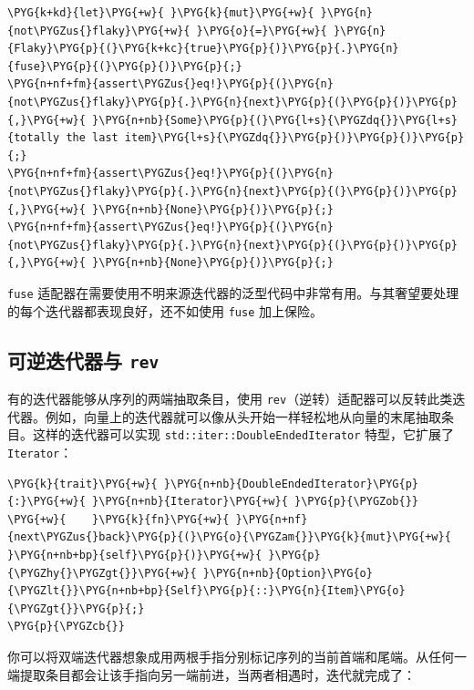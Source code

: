 \begin{Verbatim}[commandchars=\\\{\},breaklines=true,breakanywhere=true,fontsize=\codefont,xleftmargin=17bp]
\PYG{k+kd}{let}\PYG{+w}{ }\PYG{k}{mut}\PYG{+w}{ }\PYG{n}{not\PYGZus{}flaky}\PYG{+w}{ }\PYG{o}{=}\PYG{+w}{ }\PYG{n}{Flaky}\PYG{p}{(}\PYG{k+kc}{true}\PYG{p}{)}\PYG{p}{.}\PYG{n}{fuse}\PYG{p}{(}\PYG{p}{)}\PYG{p}{;}
\PYG{n+nf+fm}{assert\PYGZus{}eq!}\PYG{p}{(}\PYG{n}{not\PYGZus{}flaky}\PYG{p}{.}\PYG{n}{next}\PYG{p}{(}\PYG{p}{)}\PYG{p}{,}\PYG{+w}{ }\PYG{n+nb}{Some}\PYG{p}{(}\PYG{l+s}{\PYGZdq{}}\PYG{l+s}{totally the last item}\PYG{l+s}{\PYGZdq{}}\PYG{p}{)}\PYG{p}{)}\PYG{p}{;}
\PYG{n+nf+fm}{assert\PYGZus{}eq!}\PYG{p}{(}\PYG{n}{not\PYGZus{}flaky}\PYG{p}{.}\PYG{n}{next}\PYG{p}{(}\PYG{p}{)}\PYG{p}{,}\PYG{+w}{ }\PYG{n+nb}{None}\PYG{p}{)}\PYG{p}{;}
\PYG{n+nf+fm}{assert\PYGZus{}eq!}\PYG{p}{(}\PYG{n}{not\PYGZus{}flaky}\PYG{p}{.}\PYG{n}{next}\PYG{p}{(}\PYG{p}{)}\PYG{p}{,}\PYG{+w}{ }\PYG{n+nb}{None}\PYG{p}{)}\PYG{p}{;}
\end{Verbatim}

\texttt{fuse} 适配器在需要使用不明来源迭代器的泛型代码中非常有用。与其奢望要处理的每个迭代器都表现良好，还不如使用 \texttt{fuse} 加上保险。

\subsection{可逆迭代器与 \texttt{rev}}

有的迭代器能够从序列的两端抽取条目，使用 \texttt{rev}（逆转）适配器可以反转此类迭代器。例如，向量上的迭代器就可以像从头开始一样轻松地从向量的末尾抽取条目。这样的迭代器可以实现 \texttt{std::iter::DoubleEndedIterator} 特型，它扩展了 \texttt{Iterator}：

\begin{Verbatim}[commandchars=\\\{\},breaklines=true,breakanywhere=true,fontsize=\codefont,xleftmargin=17bp]
\PYG{k}{trait}\PYG{+w}{ }\PYG{n+nb}{DoubleEndedIterator}\PYG{p}{:}\PYG{+w}{ }\PYG{n+nb}{Iterator}\PYG{+w}{ }\PYG{p}{\PYGZob{}}
\PYG{+w}{    }\PYG{k}{fn}\PYG{+w}{ }\PYG{n+nf}{next\PYGZus{}back}\PYG{p}{(}\PYG{o}{\PYGZam{}}\PYG{k}{mut}\PYG{+w}{ }\PYG{n+nb+bp}{self}\PYG{p}{)}\PYG{+w}{ }\PYG{p}{\PYGZhy{}\PYGZgt{}}\PYG{+w}{ }\PYG{n+nb}{Option}\PYG{o}{\PYGZlt{}}\PYG{n+nb+bp}{Self}\PYG{p}{::}\PYG{n}{Item}\PYG{o}{\PYGZgt{}}\PYG{p}{;}
\PYG{p}{\PYGZcb{}}
\end{Verbatim}

你可以将双端迭代器想象成用两根手指分别标记序列的当前首端和尾端。从任何一端提取条目都会让该手指向另一端前进，当两者相遇时，迭代就完成了：

